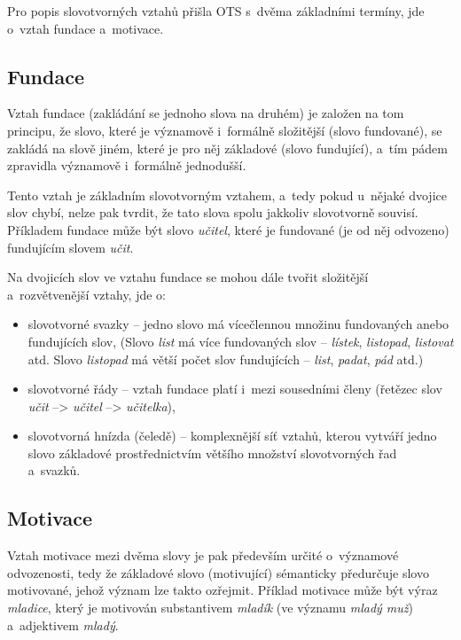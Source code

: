 Pro popis slovotvorných vztahů přišla OTS s~dvěma základními termíny,
jde o~vztah fundace a~motivace.

\hypertarget{fundace}{%
\subsection{Fundace}\label{fundace}}

Vztah fundace (zakládání se jednoho slova na druhém) je založen na tom
principu, že slovo, které je významově i~formálně složitější (slovo
fundované), se zakládá na slově jiném, které je pro něj základové (slovo
fundující), a~tím pádem zpravidla významově i~formálně jednodušší.
\parencite[95]{dokulil00}

Tento vztah je základním slovotvorným vztahem, a~tedy pokud u~nějaké
dvojice slov chybí, nelze pak tvrdit, že tato slova spolu jakkoliv
slovotvorně souvisí. Příkladem fundace může být slovo \emph{učitel},
které je fundované (je od něj odvozeno) fundujícím slovem \emph{učit}.

Na dvojicích slov ve vztahu fundace se mohou dále tvořit složitější
a~rozvětvenější vztahy, jde o:

\begin{itemize}
\tightlist
\item
  slovotvorné svazky -- jedno slovo má vícečlennou množinu fundovaných
  anebo fundujících slov, (Slovo \emph{list} má více fundovaných slov --
  \emph{lístek}, \emph{listopad}, \emph{listovat} atd. Slovo
  \emph{listopad} má větší počet slov fundujících -- \emph{list},
  \emph{padat}, \emph{pád} atd.)
\item
  slovotvorné řády -- vztah fundace platí i~mezi sousedními členy
  (řetězec slov \emph{učit} --\textgreater{} \emph{učitel}
  --\textgreater{} \emph{učitelka}),
\item
  slovotvorná hnízda (čeledě) -- komplexnější síť vztahů, kterou vytváří
  jedno slovo základové prostřednictvím většího množství slovotvorných
  řad a~svazků.~\parencite[12--13]{dokulil62}
\end{itemize}

\hypertarget{motivace}{%
\subsection{Motivace}\label{motivace}}

Vztah motivace mezi dvěma slovy je pak především určité o~významové
odvozenosti, tedy že základové slovo (motivující) sémanticky předurčuje
slovo motivované, jehož význam lze takto ozřejmit.
\parencite[96]{dokulil00} Příklad motivace může být výraz
\emph{mladice}, který je motivován substantivem \emph{mladík} (ve
významu \emph{mladý muž}) a~adjektivem \emph{mladý}.
\parencite[110]{dokulil62}


